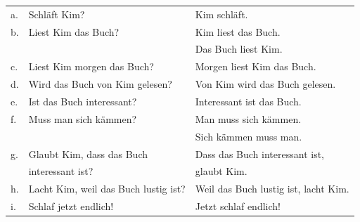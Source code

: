 \begin{tabular}[t]{@{}l@{~}ll}
a. & Schläft Kim?                                       & Kim schläft.\\
b. & Liest Kim das Buch?                            & Kim liest das Buch.\\
   &                                                      & Das Buch liest Kim.\\
c. & Liest Kim morgen das Buch?                      & Morgen liest Kim das Buch.\\
d. & Wird das Buch von Kim gelesen?                    & Von Kim wird das Buch gelesen.\\
e. & Ist das Buch interessant?                           & Interessant ist das Buch.\\
f. & Muss man sich kämmen?                                & Man muss sich kämmen.\\
   &                                                      & Sich kämmen muss man.\\
g. & Glaubt Kim, dass das Buch         & Dass das Buch interessant ist, \\
   & interessant ist?                                            & glaubt Kim.\\
h. & Lacht Kim, weil das Buch lustig ist?              & Weil das Buch lustig ist, lacht Kim.\\
i. & Schlaf jetzt endlich!                                & Jetzt schlaf endlich!\\
\end{tabular}
\z



